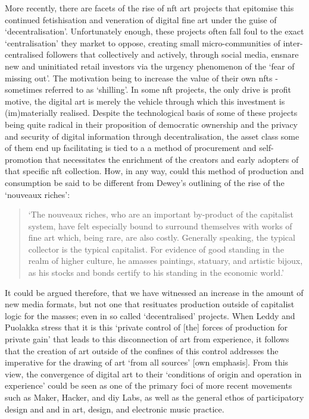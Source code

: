 More recently, there are facets of the rise of \gls{nft} art projects that epitomise this continued fetishisation and veneration of digital fine art under the guise of `decentralisation'. Unfortunately enough, these projects often fall foul to the exact `centralisation' they market to oppose, creating small micro-communities of inter-centralised followers that collectively and actively, through social media, ensnare new and uninitiated retail investors via the urgency phenomenon of the `fear of missing out'. The motivation being to increase the value of their own \glspl{nft} - sometimes referred to as `shilling'. In some \gls{nft} projects, the only drive is profit motive, the digital art is merely the vehicle through which this investment is (im)materially realised. Despite the technological basis of some of these projects being quite radical in their proposition of democratic ownership and the privacy and security of digital information through decentralisation, the asset class some of them end up facilitating is tied to a a method of procurement and self-promotion that necessitates the enrichment of the creators and early adopters of that specific \gls{nft} collection. How, in any way, could this method of production and consumption be said to be different from Dewey's outlining of the rise of the `nouveaux riches':
\begin{quote}
    `The nouveaux riches, who are an important by-product of the capitalist system, have felt especially bound to surround themselves with works of fine art which, being rare, are also costly. Generally speaking, the typical collector is the typical capitalist. For evidence of good standing in the realm of higher culture, he amasses paintings, statuary, and artistic bijoux, as his stocks and bonds certify to his standing in the economic world.' \citeyearpar[p. 7]{dewey1934}
\end{quote}
It could be argued therefore, that we have witnessed an increase in the amount of new media formats, but not one that resituates production outside of capitalist logic for the masses; even in so called `decentralised' projects. When Leddy and Puolakka stress that it is this `private control of [the] forces of production for private gain' that leads to this disconnection of art from experience, it follows that the creation of art outside of the confines of this control addresses the imperative for the drawing of art `from all sources' [own emphasis]. From this view, the convergence of digital art to their `conditions of origin and operation in experience' could be seen as one of the primary foci of more recent movements such as Maker, Hacker, and \gls{diy} Labs, as well as the general ethos of participatory design and   and  in art, design, and electronic music practice.

